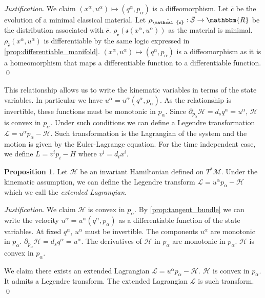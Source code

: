 \documentclass[aps,pra,10pt,twocolumn,floatfix,nofootinbib]{revtex4-1}
\numberwithin{equation}{section}
\theoremstyle{definition}
\newtheorem{prop}[equation]{Proposition}
\newenvironment{justification}{\emph{Justification}.}{\qed}
\begin{document}
\begin{justification}
	We claim $(x^\alpha, u^\alpha) \mapsto (q^\alpha, p_\alpha)$ is a diffeomorphism. Let $\bar{\mathcal{c}}$ be the evolution of a minimal classical material. Let $\rho_{\bar{\mathcal{c}}} : \bar{\mathcal{S}} \rightarrow \mathbbm{R}$ be the distribution associated with $\bar{\mathcal{c}}$. $\rho_{\bar{\mathcal{c}}}(\mathcal{s}(x^\alpha, u^\alpha))$ as the material is minimal. $\rho_{\bar{\mathcal{c}}}(x^\alpha, u^\alpha)$ is differentiable by the same logic expressed in \ref{prop:differentiable_manifold}. $(x^\alpha, u^\alpha) \mapsto (q^\alpha, p_\alpha)$ is a diffeomorphism as it is a homeomorphism that maps a differentiable function to a differentiable function.
\end{justification}

This relationship allows us to write the kinematic variables in terms of the state variables. In particular we have $u^\alpha=u^\alpha(q^\alpha, p_\alpha)$. As the relationship is invertible, these functions must be monotonic in $p_\alpha$. Since $\partial_{p_\alpha} \mathcal{H}=d_s q^\alpha= u^\alpha$, $\mathcal{H}$ is convex in $p_\alpha$. Under such conditions we can define a Legendre transformation $\mathcal{L}=u^\alpha p_\alpha - \mathcal{H}$. Such transformation is the Lagrangian of the system and the motion is given by the Euler-Lagrange equation. For the time independent case, we define $L=v^i p_i - H$ where $v^i=d_t x^i$.

\begin{prop}\label{prop:lagrangian}
	Let $\mathcal{H}$ be an invariant Hamiltonian defined on $T^*\mathcal{M}$. Under the kinematic assumption, we can define the Legendre transform $\mathcal{L}=u^\alpha p_\alpha - \mathcal{H}$ which we call the \emph{extended Lagrangian}.
\end{prop}

\begin{justification}
	We claim $\mathcal{H}$ is convex in $p_\alpha$. By \ref{prop:tangent_bundle} we can write the velocity $u^\alpha=u^\alpha(q^\alpha, p_\alpha)$ as a differentiable function of the state variables. At fixed $q^\alpha$, $u^\alpha$ must be invertible. The components $u^\alpha$ are monotonic in $p_\alpha$. $\partial_{p_\alpha} \mathcal{H}=d_s q^\alpha= u^\alpha$. The derivatives of $\mathcal{H}$ in $p_\alpha$ are monotonic in $p_\alpha$. $\mathcal{H}$ is convex in $p_\alpha$.
	
	We claim there exists an extended Lagrangian $\mathcal{L}=u^\alpha p_\alpha - \mathcal{H}$. $\mathcal{H}$ is convex in $p_\alpha$. It admits a Legendre transform. The extended Lagrangian $\mathcal{L}$ is such transform.
\end{justification}
\end{document}
